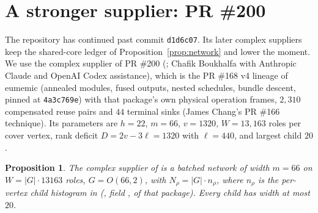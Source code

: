 \documentclass[11pt]{article}
\newtheorem{proposition}[theorem]{Proposition}
\theoremstyle{definition}
\begin{document}
\section{A stronger supplier: PR \#200}\label{sec:pr200}
The repository \cite{cms} has continued past commit \texttt{d1d6c07}. Its later
complex suppliers keep the shared-core ledger of Proposition~\ref{prop:network}
and lower the moment. We use the complex supplier of PR \#200
(\cite{pr200}; Chafik Boukhalfa with Anthropic Claude and OpenAI Codex
assistance), which is the PR \#168 v4 lineage of eumemic (annealed modules,
fused outputs, nested schedules, bundle descent, pinned at
\texttt{4a3c769e}) with that package's own physical operation frames,
$2{,}310$ compensated reuse pairs and $44$ terminal sinks (James Chang's PR
\#166 technique). Its parameters are $h=22$, $m=66$, $v=1320$,
$W=13{,}163$ roles per cover vertex, rank deficit $D=2v-3\ell=1320$ with
$\ell=440$, and largest child $20$.

\begin{proposition}\label{prop:network200}
The complex supplier of \cite{pr200} is a batched network of width $m=66$ on
$W=|G|\cdot13163$ roles, $G=O(66,2)$, with $N_\rho=|G|\cdot n_\rho$, where
$n_\rho$ is the per-vertex child histogram in
(, field , of that package). Every
child has width at most $20$.
\end{proposition}
\end{document}
